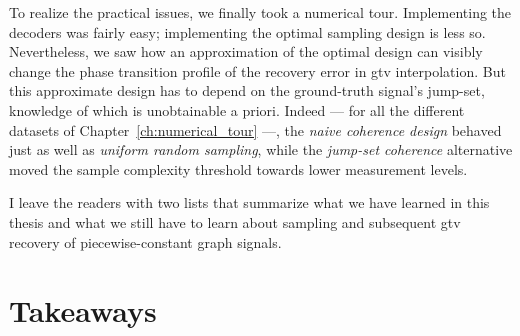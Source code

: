 To realize the practical issues, we finally took a numerical tour. Implementing the decoders was fairly easy; implementing the optimal sampling design is less so. Nevertheless, we saw how an approximation of the optimal design can visibly change the phase transition profile of the recovery error in \acrshort{gtv} interpolation. But this approximate design has to depend on the ground-truth signal's jump-set, knowledge of which is unobtainable a priori. Indeed --- for all the different datasets of Chapter~\ref{ch:numerical_tour} ---, the \emph{naive coherence design} behaved just as well as \emph{uniform random sampling}, while the \emph{jump-set coherence} alternative moved the sample complexity threshold towards lower measurement levels.

I leave the readers with two lists that summarize what we have learned in this thesis and what we still have to learn about sampling and subsequent \acrshort{gtv} recovery of piecewise-constant graph signals.

\section{Takeaways}

